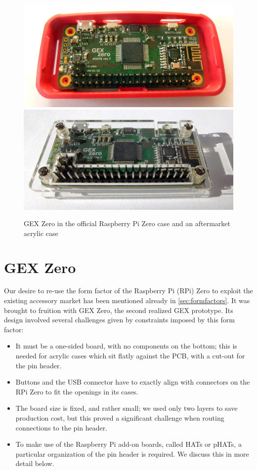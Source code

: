 \begin{figure}[h]
	\centering
	\includegraphics[width=.85\textwidth]{img/photo-zero-picase.jpg} \\
	\vspace{1mm}
	\includegraphics[width=.85\textwidth]{img/photo-zero-transparent.jpg}
	\caption[The GEX Zero module]{\label{fig:gexzcases}GEX Zero in the official Raspberry Pi Zero case and an aftermarket acrylic case}
\end{figure}

\section{GEX Zero}

Our desire to re-use the form factor of the Raspberry Pi (RPi) Zero to exploit the existing accessory market has been mentioned already in \cref{sec:formfactors}. It was brought to fruition with GEX Zero, the second realized GEX prototype. Its design involved several challenges given by constraints imposed by this form factor:

\begin{itemize}
	\item It must be a one-sided board, with no components on the bottom; this is needed for acrylic cases which sit flatly against the \gls{PCB}, with a cut-out for the pin header.
	\item Buttons and the USB connector have to exactly align with connectors on the RPi Zero to fit the openings in its cases.
	\item The board size is fixed, and rather small; we used only two layers to save production cost, but this proved a significant challenge when routing connections to the pin header.
	\item To make use of the Raspberry Pi add-on boards, called HATs or pHATs, a particular organization of the pin header is required. We discuss this in more detail below.
\end{itemize}

